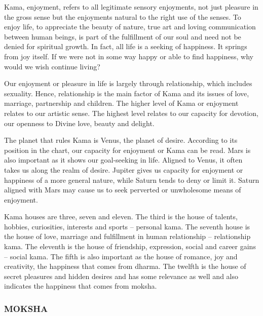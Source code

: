  

Kama, enjoyment, refers to all legitimate sensory enjoyments, not just pleasure in the gross sense but the enjoyments natural to the right use of the senses. To enjoy life, to appreciate the beauty of nature, true art and loving communication between human beings, is part of the fulfillment of our soul and need not be denied for spiritual growth. In fact, all life is a seeking of happiness. It springs from joy itself. If we were not in some way happy or able to find happiness, why would we wish continue living?

 

Our enjoy­ment or pleasure in life is largely through relationship, which includes sexuality. Hence, relationship is the main factor of Kama and its issues of love, marriage, partnership and children. The higher level of Kama or enjoyment relates to our artistic sense. The highest level relates to our capacity for devotion, our openness to Divine love, beauty and delight.

 

 


 

The planet that rules Kama is Venus, the planet of desire. According to its position in the chart, our capacity for enjoyment or Kama can be read. Mars is also important as it shows our goal-seeking in life. Aligned to Venus, it often takes us along the realm of desire. Jupiter gives us capacity for enjoyment or happiness of a more general nature, while Saturn tends to deny or limit it. Saturn aligned with Mars may cause us to seek perverted or unwholesome means of enjoyment.

 

Kama houses are three, seven and eleven. The third is the house of talents, hobbies, curiosities, interests and sports – personal kama. The seventh house is the house of love, marriage and fulfillment in human relationship – relationship kama. The eleventh is the house of friendship, expression, social and career gains – social kama. The fifth is also important as the house of romance, joy and creativity, the happiness that comes from dharma. The twelfth is the house of secret pleasures and hidden desires and has some relevance as well and also indicates the happiness that comes from moksha.

 

 

\subsubsection{MOKSHA}

